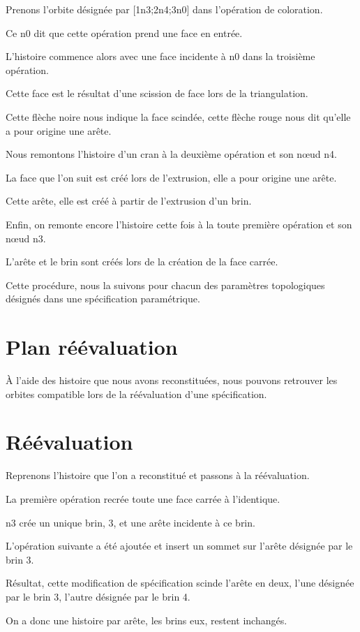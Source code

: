 \documentclass[11pt]{article}
\begin{document}
Prenons l'orbite désignée par [1n3;2n4;3n0] dans l'opération de coloration.

Ce n0 dit que cette opération prend une face en entrée.

L'histoire commence alors avec une face incidente à n0 dans la troisième opération.

Cette face est le résultat d'une scission de face lors de la triangulation.

Cette flèche noire nous indique la face scindée, cette flèche rouge nous dit
qu'elle a pour origine une arête.

Nous remontons l'histoire d'un cran à la deuxième opération et son nœud n4.

La face que l'on suit est créé lors de l'extrusion, elle a pour origine une
arête.

Cette arête, elle est créé à partir de l'extrusion d'un brin.

Enfin, on remonte encore l'histoire cette fois à la toute première opération et son nœud n3.

L'arête et le brin sont créés lors de la création de la face carrée.

Cette procédure, nous la suivons pour chacun des paramètres topologiques
désignés dans une spécification paramétrique.
\section{Plan réévaluation}
\label{sec:org04c39be}

À l'aide des histoire que nous avons reconstituées, nous pouvons retrouver les
orbites compatible lors de la réévaluation d'une spécification.
\section{Réévaluation}
\label{sec:org3b38850}

Reprenons l'histoire que l'on a reconstitué et passons à la réévaluation.

La première opération recrée toute une face carrée à l'identique.

n3 crée un unique brin, 3, et une arête incidente à ce brin.

L'opération suivante a été ajoutée et insert un sommet sur l'arête désignée par
le brin 3.

Résultat, cette modification de spécification scinde l'arête en deux, l'une
désignée par le brin 3, l'autre désignée par le brin 4.

On a donc une histoire par arête, les brins eux, restent inchangés.
\end{document}
